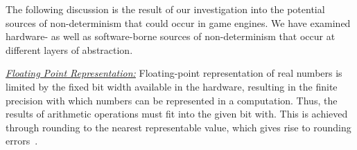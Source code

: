 \documentclass[letterpaper, 10 pt, journal, twoside]{IEEEtran}
\begin{document}
The following discussion is the result of our investigation into the potential sources of non-determinism that could occur in game engines. We have examined hardware- as well as software-borne sources of non-determinism that occur at different layers of abstraction. 

\medskip


\noindent\underline{\textit{Floating Point Representation:}}
Floating-point representation of real numbers is limited by the fixed bit width available in the hardware, resulting in the finite precision with which numbers can be represented in a computation. 
Thus, the results of arithmetic operations must fit into the given bit with. This is achieved through rounding to the nearest representable value, which gives rise to rounding errors~\cite{FloatingPointsBook,goldberg1991every}. 
%
\end{document}

